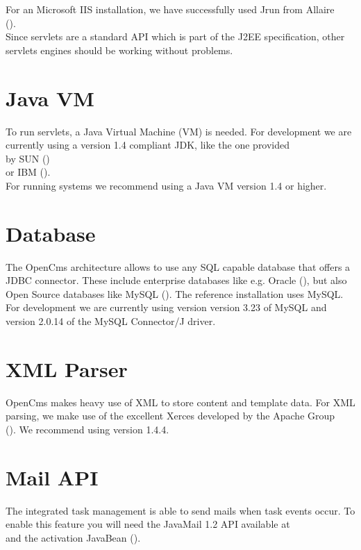 For an Microsoft IIS installation, we have successfully used Jrun from Allaire \\
().\\
Since servlets are a standard API which is part of the J2EE specification,
other servlets engines should be working without problems.

\section{Java VM}
To run servlets, a Java Virtual Machine (VM) is needed. For development we are currently using
a version 1.4 compliant JDK, like the one provided \\
by SUN ()\\
or IBM ().\\
For running systems we recommend using a Java VM version 1.4 or higher.

\section{Database}
The OpenCms architecture allows to use any SQL capable database that offers a JDBC connector.
These include enterprise databases like e.g. Oracle (),
but also Open Source databases like MySQL ().
The reference installation uses MySQL. For development we are currently using version version 3.23 of 
MySQL and version 2.0.14 of the MySQL Connector/J driver.

\section{XML Parser}
OpenCms makes heavy use of XML to store content and template data. For XML parsing, we make use of
the excellent Xerces developed by the Apache Group\\
().
We recommend using version 1.4.4.

\section{Mail API}
The integrated task management is able to send mails when task events occur.
To enable this feature you will need the JavaMail 1.2 API available at \\
 and the activation Java\-Bean
().

